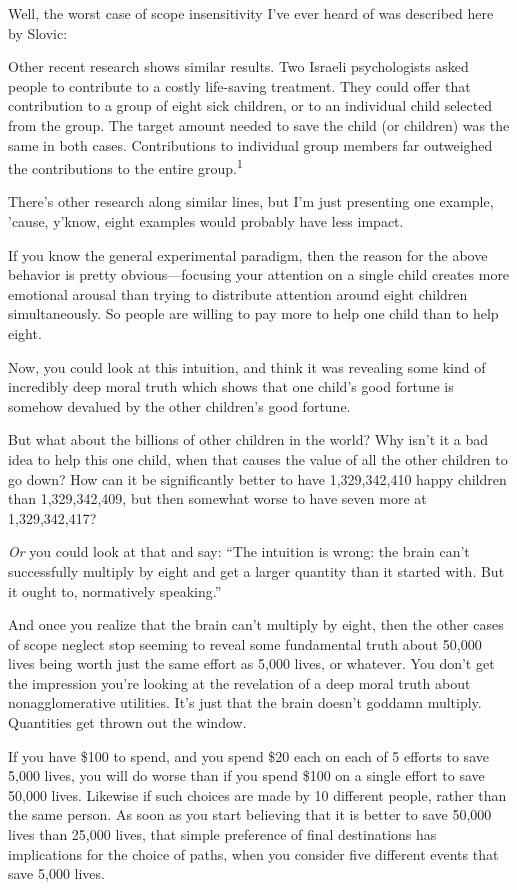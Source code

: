 {
 Well, the worst case of scope insensitivity I've
ever heard of was described here by Slovic:}

{
 Other recent research shows similar results. Two Israeli
psychologists asked people to contribute to a costly life-saving
treatment. They could offer that contribution to a group of eight sick
children, or to an individual child selected from the group. The target
amount needed to save the child (or children) was the same in both
cases. Contributions to individual group members far outweighed the
contributions to the entire group.\textsuperscript{1}}

{
 There's other research along similar lines, but
I'm just presenting one example,
'cause, y'know, eight examples would
probably have less impact.}

{
 If you know the general experimental paradigm, then the reason for
the above behavior is pretty obvious---focusing your attention on a
single child creates more emotional arousal than trying to distribute
attention around eight children simultaneously. So people are willing
to pay more to help one child than to help eight.}

{
 Now, you could look at this intuition, and think it was revealing
some kind of incredibly deep moral truth which shows that one
child's good fortune is somehow devalued by the other
children's good fortune.}

{
 But what about the billions of other children in the world? Why
isn't it a bad idea to help this one child, when that
causes the value of all the other children to go down? How can it be
significantly better to have 1,329,342,410 happy children than
1,329,342,409, but then somewhat worse to have seven more at
1,329,342,417?}

{
 \textit{Or} you could look at that and say: ``The
intuition is wrong: the brain can't successfully
multiply by eight and get a larger quantity than it started with. But
it ought to, normatively speaking.''}

{
 And once you realize that the brain can't multiply
by eight, then the other cases of scope neglect stop seeming to reveal
some fundamental truth about 50,000 lives being worth just the same
effort as 5,000 lives, or whatever. You don't get the
impression you're looking at the revelation of a deep
moral truth about nonagglomerative utilities. It's just
that the brain doesn't goddamn multiply. Quantities get
thrown out the window.}

{
 If you have \$100 to spend, and you spend \$20 each on each of 5
efforts to save 5,000 lives, you will do worse than if you spend \$100
on a single effort to save 50,000 lives. Likewise if such choices are
made by 10 different people, rather than the same person. As soon as
you start believing that it is better to save 50,000 lives than 25,000
lives, that simple preference of final destinations has implications
for the choice of paths, when you consider five different events that
save 5,000 lives.}

